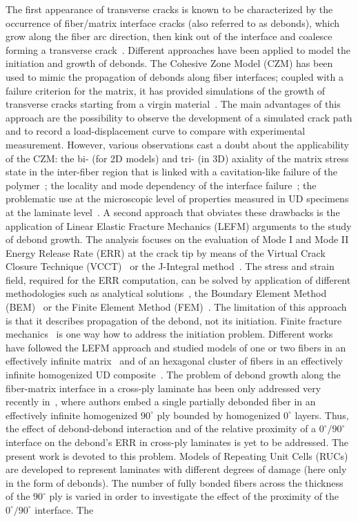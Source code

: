 \documentclass[review]{elsarticle}
\begin{document}
The first appearance of transverse cracks is known to be characterized by the occurrence of fiber/matrix interface cracks (also referred to as debonds), which grow along the fiber arc direction, then kink out of the interface and coalesce forming a transverse crack~\cite{Bailey1981}. Different approaches have been applied to model the initiation and growth of debonds. The Cohesive Zone Model (CZM) has been used to mimic the propagation of debonds along fiber interfaces; coupled with a failure criterion for the matrix, it has provided simulations of the growth of transverse cracks starting from a virgin material~\cite{Kushch2011,Canal2012,Bouhala2013,Herraez2015}. The main advantages of this approach are the possibility to observe the development of a simulated crack path and to record a load-displacement curve to compare with experimental measurement. However, various observations cast a doubt about the applicability of the CZM: the bi- (for 2D models) and tri- (in 3D) axiality of the matrix stress state in the inter-fiber region that is linked with a cavitation-like failure of the polymer~\cite{Asp1995}; the locality and mode dependency of the interface failure~\cite{Mantic2009}; the problematic use at the microscopic level of properties measured in UD specimens at the laminate level~\cite{Canal2012}. A second approach that obviates these drawbacks is the application of Linear Elastic Fracture Mechanics (LEFM) arguments to the study of debond growth. The analysis focuses on the evaluation of Mode I and Mode II Energy Release Rate (ERR) at the crack tip by means of the Virtual Crack Closure Technique (VCCT)~\cite{Krueger2004} or the J-Integral method~\cite{Rice1968}. The stress and strain field, required for the ERR computation, can be solved by application of different methodologies such as analytical solutions~\cite{Toya1974}, the Boundary Element Method (BEM)~\cite{Paris1996} or the Finite Element Method (FEM)~\cite{Zhuang2018}. The limitation of this approach is that it describes propagation of the debond, not its initiation. Finite fracture mechanics~\cite{MunozReja2016} is one way how to address the initiation problem. Different works have followed the LEFM approach and studied models of one or two fibers in an effectively infinite matrix~\cite{Correa2011,Correa2013,Correa2014,Sandino2016,Sandino2018} and of an hexagonal cluster of fibers in an effectively infinite homogenized UD composite~\cite{Varna2017,Zhuang2018}. The problem of debond growth along the fiber-matrix interface in a cross-ply laminate has been only addressed very recently in~\cite{Velasco2018,Paris2018}, where authors embed a single partially debonded fiber in an effectively infinite homogenized $90^{\circ}$ ply bounded by homogenized $0^{\circ}$ layers. Thus, the effect of debond-debond interaction and of the relative proximity of a $0^{\circ}/90^{\circ}$ interface on the debond's ERR in cross-ply laminates is yet to be addressed. The present work is devoted to this problem. Models of Repeating Unit Cells (RUCs) are developed to represent laminates with different degrees of damage (here only in the form of debonds). The number of fully bonded fibers across the thickness of the $90^{\circ}$ ply is varied in order to investigate the effect of the proximity of the $0^{\circ}/90^{\circ}$ interface. The 
\end{document}

